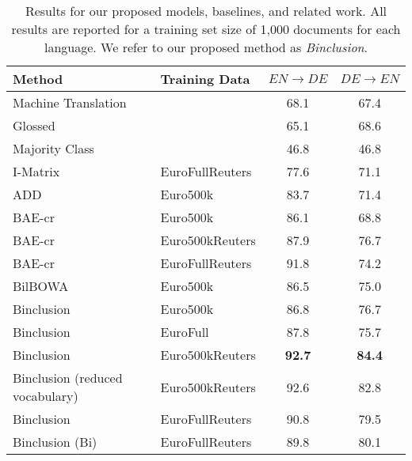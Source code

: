 \documentclass{article} \usepackage{iclr2015,times}
\newcommand{\modelname}{Binclusion }
\begin{document}
\begin{table}[t]
    \caption{Results for our proposed models, baselines, and related work.
        All results are reported for a training set size of 1,000 documents
    for each language. We refer to our proposed method as \emph{Binclusion}.}
    \label{tab:classification-results}
    \begin{center}
        \begin{tabular}{p{17em}lcc}
    \toprule
    Method  & Training Data & $EN\rightarrow DE$ & $DE\rightarrow EN$ \\
    \midrule
    Machine Translation                                     && 68.1          & 67.4   \\
    Glossed                                                 && 65.1          & 68.6   \\
    Majority Class                                          && 46.8          & 46.8   \\
    \midrule
    I-Matrix\hfill\citep{klementiev2012inducing} & EuroFullReuters  & 77.6          & 71.1   \\
    ADD\hfill\citep{hermann2014multilingual} & Euro500k          & 83.7          & 71.4   \\
    BAE-cr\hfill\citep{chandar2014autoencoder} & Euro500k        & 86.1          & 68.8   \\
    BAE-cr\hfill\citep{chandar2014autoencoder} & Euro500kReuters & 87.9          & 76.7   \\
    BAE-cr\hfill\citep{chandar2014autoencoder} & EuroFullReuters & 91.8 & 74.2   \\
    BilBOWA\hfill\citep{gouws2014bilbowa} & Euro500k             & 86.5          & 75.0   \\
    \midrule
    
    \modelname  &Euro500k                                  & 86.8          & 76.7   \\ 
    \modelname  &EuroFull                                  & 87.8          & 75.7   \\ 
    \modelname  &Euro500kReuters                           & \textbf{92.7}          & \textbf{84.4}   \\ 
    \modelname  (reduced vocabulary) &Euro500kReuters                              & 92.6          & 82.8   \\   
    \modelname  &EuroFullReuters                           & 90.8          & 79.5   \\ 
    \modelname  (Bi) &EuroFullReuters                       & 89.8          & 80.1   \\ 
    \bottomrule
    \end{tabular}
    \end{center}
\end{table}
\end{document}
